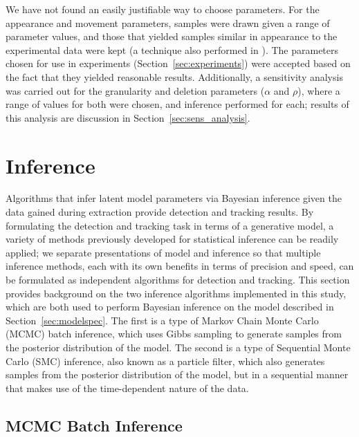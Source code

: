 \documentclass[twocolumn, final]{svjour3}
\begin{document}
We have not found an easily justifiable way to choose parameters. For the appearance and movement parameters, samples were drawn given a range of parameter values, and those that yielded samples similar in appearance to the experimental data were kept (a technique also performed in \cite{gasthaus_thesis}). The parameters chosen for use in experiments (Section~\ref{sec:experiments}) were accepted based on the fact that they yielded reasonable results. Additionally, a sensitivity analysis was carried out for the granularity and deletion parameters ($\alpha$ and $\rho$), where a range of values for both were chosen, and inference performed for each; results of this analysis are discussion in Section~\ref{sec:sens_analysis}.





\section{Inference}
\label{sec:inference}
Algorithms that infer latent model parameters via Bayesian inference given the data gained during extraction provide detection and tracking results. By formulating the detection and tracking task in terms of a generative model, a variety of methods previously developed for statistical inference can be readily applied; we separate presentations of model and inference so that multiple inference methods, each with its own benefits in terms of precision and speed, can be formulated as independent algorithms for detection and tracking. This section provides background on the two inference algorithms implemented in this study, which are both used to perform Bayesian inference on the model described in Section~\ref{sec:modelspec}. The first is a type of Markov Chain Monte Carlo (MCMC) batch inference, which uses Gibbs sampling to generate samples from the posterior distribution of the model. The second is a type of Sequential Monte Carlo (SMC) inference, also known as a particle filter, which also generates samples from the posterior distribution of the model, but in a sequential manner that makes use of the time-dependent nature of the data.






\subsection{MCMC Batch Inference}
\label{sec:MCMC}
\end{document}
